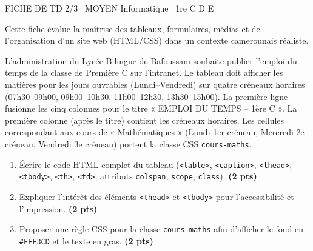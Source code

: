 \documentclass[11pt]{article}
\begin{document}
\begin{tcolorbox}[enhanced,colback=popink,colframe=popink,arc=10pt,boxrule=0pt,left=12pt,right=12pt,top=9pt,bottom=9pt]
{\color{white}\popxbold\small FICHE DE TD 2/3 \textbullet\ MOYEN \hfill Informatique \textbullet\ 1re C D E\par}
\end{tcolorbox}
\vspace{4pt}
\noindent Cette fiche évalue la maîtrise des tableaux, formulaires, médias et de l'organisation d'un site web (HTML/CSS) dans un contexte camerounais réaliste.

\begin{exercice}
L'administration du Lycée Bilingue de Bafoussam souhaite publier l'emploi du temps de la classe de Première C sur l'intranet. Le tableau doit afficher les matières pour les jours ouvrables (Lundi--Vendredi) sur quatre créneaux horaires (07h30--09h00, 09h00--10h30, 11h00--12h30, 13h30--15h00). La première ligne fusionne les cinq colonnes pour le titre « EMPLOI DU TEMPS -- 1ère C ». La première colonne (après le titre) contient les créneaux horaires. Les cellules correspondant aux cours de « Mathématiques » (Lundi 1er créneau, Mercredi 2e créneau, Vendredi 3e créneau) portent la classe CSS \texttt{cours-maths}.
\begin{enumerate}
    \item Écrire le code HTML complet du tableau (\texttt{<table>}, \texttt{<caption>}, \texttt{<thead>}, \texttt{<tbody>}, \texttt{<th>}, \texttt{<td>}, attributs \texttt{colspan}, \texttt{scope}, \texttt{class}). \hfill\textbf{(2 pts)}
    \item Expliquer l'intérêt des éléments \texttt{<thead>} et \texttt{<tbody>} pour l'accessibilité et l'impression. \hfill\textbf{(2 pts)}
    \item Proposer une règle CSS pour la classe \texttt{cours-maths} afin d'afficher le fond en \texttt{\#FFF3CD} et le texte en gras. \hfill\textbf{(2 pts)}
\end{enumerate}
\end{exercice}
\end{document}
